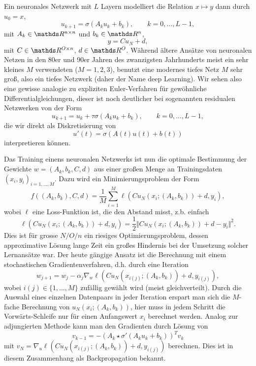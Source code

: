 Ein neuronales Netzwerk mit $L$ Layern modelliert die Relation $x \mapsto y$ dann durch $u_0 =x$, 
$$ u_{k+1} = \sigma(A_k u_k + b_k) , \qquad k=0,\ldots,L-1,$$
mit $A_k \in \R^{n \times n}$ und $b_k \in \R^n$, 
$$ y = C u_N + d, $$
mit $C \in \R^{O \times n}$, $d\in \R^O$. 
Während ältere Ansätze von neuronalen Netzen in den 80er und 90er Jahren des zwanzigsten Jahrhunderts meist ein sehr kleines $M$ verwendeten ($M=1,2,3$), benutzt eine modernes tiefes Netz $M$ sehr gro{\ss}, also ein tiefes Netzwerk (daher der Name deep Learning). Wir sehen also eine gewisse analogie zu expliziten Euler-Verfahren für gewöhnliche Differentialgleichungen, dieser ist noch deutlicher bei sogenannten residualen Netzwerken von der Form
$$ u_{k+1} = u_k + \tau \sigma(A_k u_k + b_k) , \qquad k=0,\ldots,L-1,$$
die wir direkt als Diskretisierung von 
$$ u'(t) = \sigma(A(t) u(t) + b(t))$$
interpretieren können. 

Das Training einens neuronalen Netzwerks ist nun die optimale Bestimmung der Gewichte $w = (A_k, b_k, C, d)$ aus einer gro{\ss}en Menge an Trainingsdaten $(x_i,y_i)_{i=1,\ldots,M}$. Dazu wird ein Minimierungsproblem der Form 
$$ f((A_k,b_k),C,d)  = \frac{1}M \sum_{i=1}^M \ell(C u_N(x_i;(A_k,b_k))+d,y_i), $$
wobei $\ell$ eine Loss-Funktion ist, die den Abstand misst, z.b. einfach
$$ \ell(C u_N(x_i;(A_k,b_k))+d,y_i) = \frac{1}2 \Vert C u_N(x_i;(A_k,b_k))+d - y_i \Vert^2. $$
Dies ist für gro{ss}e $N / O / n$ ein riesiges Optimierungsproblem, dessen approximative Lösung lange Zeit ein gro{\ss}es Hindernis bei der Umsetzung solcher Lernansätze war. Der heute gängige Ansatz ist die Berechnung mit einem stochastischen Gradientenverfahren, d.h. durch eine Iteration
$$ w_{j+1} =  w_j - \alpha_j \nabla_w \ell(C u_N(x_{i(j)};(A_k,b_k))+d,y_{i(j)}), $$
wobei $i(j) \in \{1,\ldots,M\}$ zufällig gewählt wird (meist gleichverteilt). Durch die Auswahl eines einzelnen Datenpaars in jeder Iteration erspart man sich die $M$-fache Berechnung von $u_N(x_{i };(A_k,b_k))$, hier muss in jedem Schritt die Vorwärts-Schleife  nur für einen Anfangswert $x_i$ berechnet werden.  Analog zur adjungierten Methode kann man den Gradienten durch Lösung von 
$$ v_{k-1} = -  (A_k \star \sigma'(A_k u_k + b_k))^T v_k $$
mit $v_N = \nabla_u \ell(C u_N(x_{i(j)};(A_k,b_k))+d,y_{i(j)})$ berechnen. Dies ist in diesem Zusammenhang als Backpropagation bekannt.